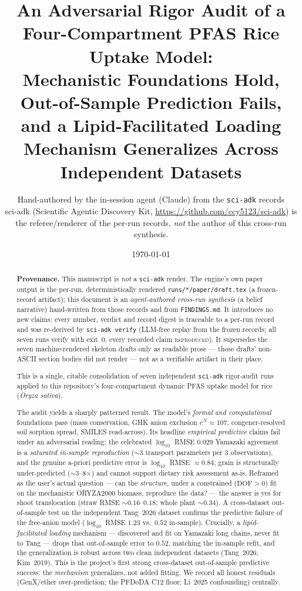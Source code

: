\documentclass[11pt]{article}
\title{An Adversarial Rigor Audit of a Four-Compartment PFAS Rice
Uptake Model:\\
Mechanistic Foundations Hold, Out-of-Sample Prediction Fails,
and a Lipid-Facilitated Loading Mechanism Generalizes Across
Independent Datasets}
\author{Hand-authored by the in-session agent (Claude) from the
\texttt{sci-adk} records\\
\small sci-adk (Scientific Agentic Discovery Kit,
\url{https://github.com/ccy5123/sci-adk}) is the referee/renderer of the
per-run records, \emph{not} the author of this cross-run synthesis.}
\date{\today}
\begin{document}
\maketitle

\begin{abstract}
\noindent
\textbf{Provenance.} This manuscript is \emph{not} a \texttt{sci-adk}
render. The engine's own paper output is the per-run, deterministically
rendered \texttt{runs/*/paper/draft.tex} (a frozen-record artifact);
this document is an \emph{agent-authored cross-run synthesis} (a belief
narrative) hand-written from those records and from
\texttt{FINDINGS.md}. It introduces no new claims: every number,
verdict and record digest is traceable to a per-run record and was
re-derived by \texttt{sci-adk verify} (LLM-free replay from the frozen
records; all seven runs verify with exit~0, every recorded claim
\textsc{reproduced}). It supersedes the seven machine-rendered skeleton
drafts only as readable prose --- those drafts' non-ASCII section
bodies did not render --- not as a verifiable artifact in their place.

\medskip\noindent
This is a single, citable consolidation of seven independent
\texttt{sci-adk} rigor-audit runs applied to this repository's
four-compartment dynamic PFAS uptake model for rice
(\textit{Oryza sativa}).

The audit yields a sharply patterned result. The model's
\emph{formal and computational} foundations pass (mass conservation,
GHK anion exclusion $e^{N}\!\approx\!107$, congener-resolved soil
sorption spread, SMILES read-across). Its headline \emph{empirical
predictive} claims fail under an adversarial reading: the celebrated
$\log_{10}$ RMSE $0.029$ Yamazaki agreement is a \emph{saturated
in-sample reproduction} ($\sim$3 transport parameters per 3
observations), and the genuine a-priori predictive error is
$\log_{10}$ RMSE $\approx 0.84$; grain is structurally
under-predicted ($\sim$3--8$\times$) and cannot support dietary risk
assessment as-is. Reframed as the user's actual question --- can the
\emph{structure}, under a constrained ($\mathrm{DOF}>0$) fit on the
mechanistic ORYZA2000 biomass, reproduce the data? --- the answer is
yes for shoot translocation (straw RMSE $\sim 0.16$--$0.18$; whole
plant $\sim 0.34$). A cross-dataset out-of-sample test on the
independent Tang~2026 dataset confirms the predictive failure of the
free-anion model ($\log_{10}$ RMSE $1.23$ vs.\ $0.52$ in-sample).
Crucially, a \emph{lipid-facilitated loading} mechanism --- discovered
and fit on Yamazaki long chains, never fit to Tang --- drops that
out-of-sample error to $0.52$, matching the in-sample refit, and the
generalization is robust across two clean independent datasets
(Tang~2026, Kim~2019). This is the project's first strong
cross-dataset out-of-sample predictive success: the \emph{mechanism}
generalizes, not added fitting. We record all honest residuals
(GenX/ether over-prediction; the PFDoDA C12 floor; Li~2025
confounding) centrally.
\end{abstract}
\end{document}
